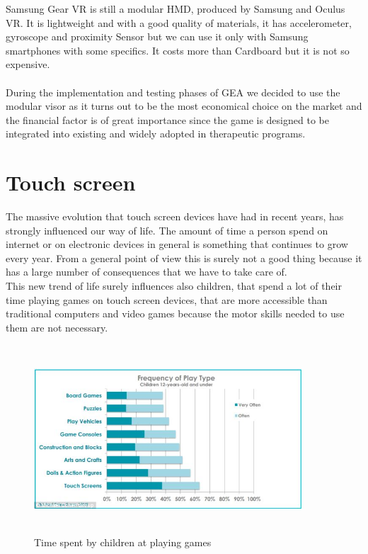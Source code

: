 Samsung Gear VR is still a modular HMD, produced by Samsung and Oculus VR. It is lightweight and with a good quality of materials, it has accelerometer, gyroscope and proximity Sensor but we can use it only with Samsung smartphones with some specifics. It costs more than Cardboard but it is not so expensive.\\
\\
During the implementation and testing phases of GEA we decided to use the modular visor as it turns out to be the most economical choice on the market and the financial factor is of great importance since the game is designed to be integrated into existing and widely adopted in therapeutic programs.

\section{Touch screen}
The massive evolution that touch screen devices have had in recent years, has strongly influenced our way of life. The amount of time a person spend on internet or on electronic devices in general is something that continues to grow every year. From a general point of view this is surely not a good thing because it has a large number of consequences that we have to take care of. \\
This new trend of life surely influences also children, that spend a lot of their time playing games on touch screen devices, that are more accessible than traditional computers and video games because the motor skills needed to use them are not necessary.\\
\begin{figure}[H]
\centering
\includegraphics[width=10cm, height=7cm]{immagini/touch.png}
\caption{Time spent by children at playing games}\label{fig:timegames}
\end{figure}
